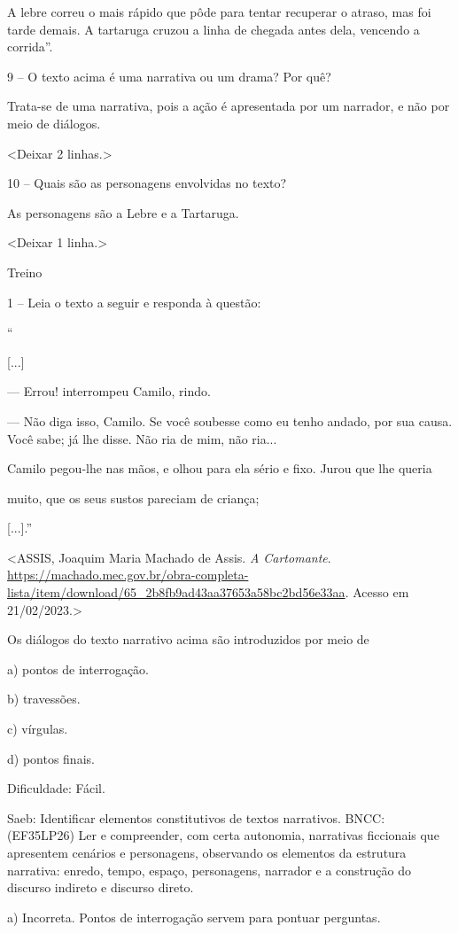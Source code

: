 A lebre correu o mais rápido que pôde para tentar recuperar o atraso,
mas foi tarde demais. A tartaruga cruzou a linha de chegada antes dela,
vencendo a corrida''.

9 -- O texto acima é uma narrativa ou um drama? Por quê?

Trata-se de uma narrativa, pois a ação é apresentada por um narrador, e
não por meio de diálogos.

\textless{}Deixar 2 linhas.\textgreater{}

10 -- Quais são as personagens envolvidas no texto?

As personagens são a Lebre e a Tartaruga.

\textless{}Deixar 1 linha.\textgreater{}

Treino

1 -- Leia o texto a seguir e responda à questão:

``

{[}...{]}

--- Errou! interrompeu Camilo, rindo.

--- Não diga isso, Camilo. Se você soubesse como eu tenho andado, por
sua causa. Você sabe; já lhe disse. Não ria de mim, não ria...

Camilo pegou-lhe nas mãos, e olhou para ela sério e fixo. Jurou que lhe
queria

muito, que os seus sustos pareciam de criança;

{[}...{]}.''

\textless{}ASSIS, Joaquim Maria Machado de Assis. \emph{A Cartomante}.
\url{https://machado.mec.gov.br/obra-completa-lista/item/download/65_2b8fb9ad43aa37653a58bc2bd56e33aa}.
Acesso em 21/02/2023.\textgreater{}

Os diálogos do texto narrativo acima são introduzidos por meio de

a) pontos de interrogação.

b) travessões.

c) vírgulas.

d) pontos finais.

Dificuldade: Fácil.

Saeb: Identificar elementos constitutivos de textos narrativos. BNCC:
(EF35LP26) Ler e compreender, com certa autonomia, narrativas ficcionais
que apresentem cenários e personagens, observando os elementos da
estrutura narrativa: enredo, tempo, espaço, personagens, narrador e a
construção do discurso indireto e discurso direto.

a) Incorreta. Pontos de interrogação servem para pontuar perguntas.

